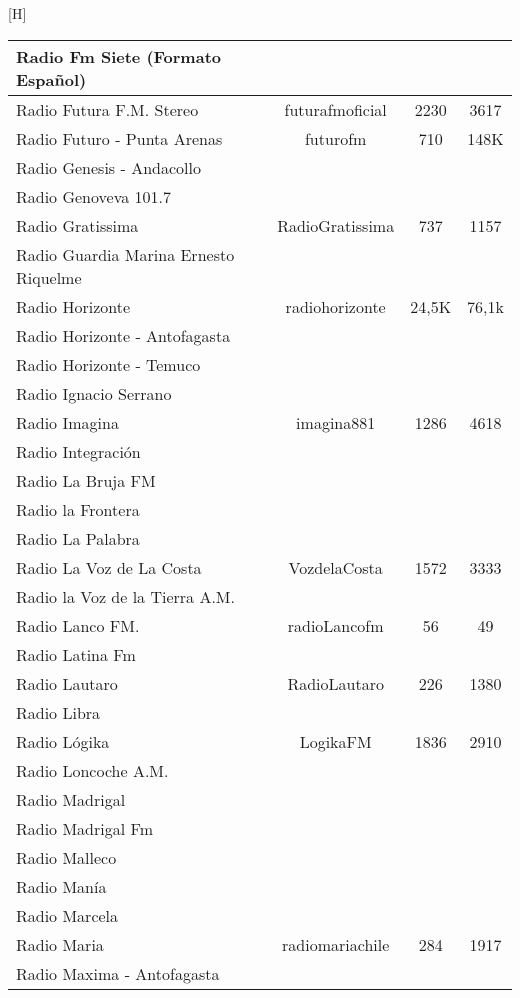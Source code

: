 \begin{center}[H]
\begin{longtable}{| l | c | c | c |}
Radio Fm Siete (Formato Español)	&		&		&		\\ \hline
Radio Futura F.M. Stereo	&	futurafmoficial	&	2230	&	3617	\\ \hline
Radio Futuro - Punta Arenas	&	futurofm	&	710	&	148K	\\ \hline
Radio Genesis - Andacollo	&		&		&		\\ \hline
Radio Genoveva 101.7	&		&		&		\\ \hline
Radio Gratissima	&	RadioGratissima	&	737	&	1157	\\ \hline
Radio Guardia Marina Ernesto Riquelme	&		&		&		\\ \hline
Radio Horizonte	&	radiohorizonte	&	24,5K	&	76,1k	\\ \hline
Radio Horizonte - Antofagasta	&		&		&		\\ \hline
Radio Horizonte - Temuco	&		&		&		\\ \hline
Radio Ignacio Serrano	&		&		&		\\ \hline
Radio Imagina	&	imagina881	&	1286	&	4618	\\ \hline
Radio Integración	&		&		&		\\ \hline
Radio La Bruja FM	&		&		&		\\ \hline
Radio la Frontera	&		&		&		\\ \hline
Radio La Palabra	&		&		&		\\ \hline
Radio La Voz de La Costa	&	VozdelaCosta	&	1572	&	3333	\\ \hline
Radio la Voz de la Tierra A.M.	&		&		&		\\ \hline
Radio Lanco FM.	&	radioLancofm	&	56	&	49	\\ \hline
Radio Latina Fm	&		&		&		\\ \hline
Radio Lautaro	&	RadioLautaro	&	226	&	1380	\\ \hline
Radio Libra	&		&		&		\\ \hline
Radio Lógika	&	LogikaFM	&	1836	&	2910	\\ \hline
Radio Loncoche A.M.	&		&		&		\\ \hline
Radio Madrigal	&		&		&		\\ \hline
Radio Madrigal Fm	&		&		&		\\ \hline
Radio Malleco	&		&		&		\\ \hline
Radio Manía	&		&		&		\\ \hline
Radio Marcela	&		&		&		\\ \hline
Radio Maria	&	radiomariachile	&	284	&	1917	\\ \hline
Radio Maxima - Antofagasta	&		&		&		\\ \hline

\end{longtable}
\end{center}
